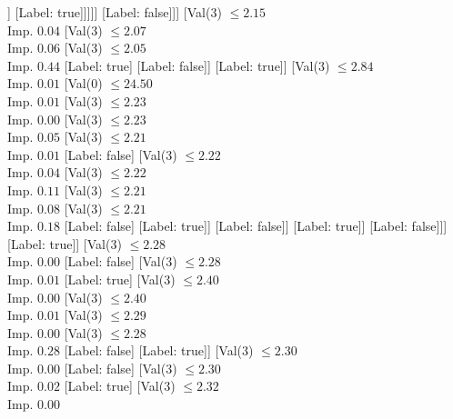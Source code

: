 \documentclass[margin=10pt]{standalone}
\begin{document}
\begin{forest}
										[Label: false]
										[Val($3$) $ \leq 2.73$ \\ Imp. $0.11$
											[Val($3$) $ \leq 2.73$ \\ Imp. $0.50$
												[Label: true]
												[Label: false]]
											[Label: true]]]]]
							[Label: false]]]
					[Val($3$) $ \leq 2.15$ \\ Imp. $0.04$
						[Val($3$) $ \leq 2.07$ \\ Imp. $0.06$
							[Val($3$) $ \leq 2.05$ \\ Imp. $0.44$
								[Label: true]
								[Label: false]]
							[Label: true]]
						[Val($3$) $ \leq 2.84$ \\ Imp. $0.01$
							[Val($0$) $ \leq 24.50$ \\ Imp. $0.01$
								[Val($3$) $ \leq 2.23$ \\ Imp. $0.00$
									[Val($3$) $ \leq 2.23$ \\ Imp. $0.05$
										[Val($3$) $ \leq 2.21$ \\ Imp. $0.01$
											[Label: false]
											[Val($3$) $ \leq 2.22$ \\ Imp. $0.04$
												[Val($3$) $ \leq 2.22$ \\ Imp. $0.11$
													[Val($3$) $ \leq 2.21$ \\ Imp. $0.08$
														[Val($3$) $ \leq 2.21$ \\ Imp. $0.18$
															[Label: false]
															[Label: true]]
														[Label: false]]
													[Label: true]]
												[Label: false]]]
										[Label: true]]
									[Val($3$) $ \leq 2.28$ \\ Imp. $0.00$
										[Label: false]
										[Val($3$) $ \leq 2.28$ \\ Imp. $0.01$
											[Label: true]
											[Val($3$) $ \leq 2.40$ \\ Imp. $0.00$
												[Val($3$) $ \leq 2.40$ \\ Imp. $0.01$
													[Val($3$) $ \leq 2.29$ \\ Imp. $0.00$
														[Val($3$) $ \leq 2.28$ \\ Imp. $0.28$
															[Label: false]
															[Label: true]]
														[Val($3$) $ \leq 2.30$ \\ Imp. $0.00$
															[Label: false]
															[Val($3$) $ \leq 2.30$ \\ Imp. $0.02$
																[Label: true]
																[Val($3$) $ \leq 2.32$ \\ Imp. $0.00$

\end{forest}
\end{document}
